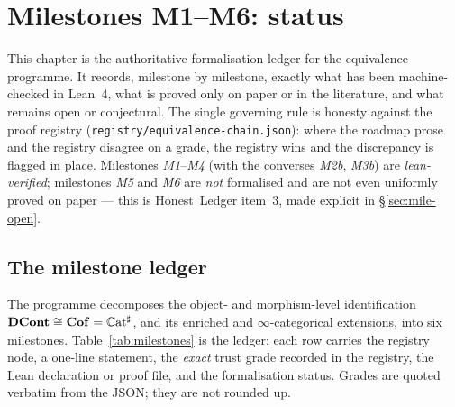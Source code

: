 \chapter{Milestones M1--M6: status}
\label{ch:milestones}
This chapter is the authoritative formalisation ledger for the equivalence
programme. It records, milestone by milestone, exactly what has been
machine-checked in Lean~4, what is proved only on paper or in the literature, and
what remains open or conjectural. The single governing rule is honesty against the
proof registry (\texttt{registry/equivalence-chain.json}): where the roadmap prose
and the registry disagree on a grade, the registry wins and the discrepancy is
flagged in place. Milestones \emph{M1}--\emph{M4} (with the converses \emph{M2b},
\emph{M3b}) are \emph{lean-verified}; milestones \emph{M5} and \emph{M6} are
\emph{not} formalised and are not even uniformly proved on paper --- this is
Honest~Ledger item~3, made explicit in \S\ref{sec:mile-open}.

\section{The milestone ledger}\label{sec:mile-ledger}

The programme decomposes the object- and morphism-level identification
$\mathbf{DCont}\cong\mathbf{Cof}=\mathbb C\mathrm{at}^{\sharp}$, and its enriched and
$\infty$-categorical extensions, into six milestones. Table~\ref{tab:milestones}
is the ledger: each row carries the registry node, a one-line statement, the
\emph{exact} trust grade recorded in the registry, the Lean declaration or proof
file, and the formalisation status. Grades are quoted verbatim from the JSON; they
are not rounded up.

